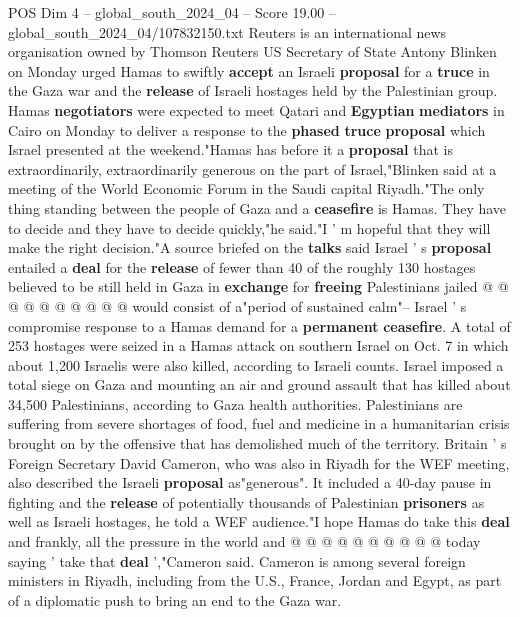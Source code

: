 \begin{textsample}{POS Dim 4 – global\_south\_2024\_04 – Score 19.00 – global\_south\_2024\_04/107832150.txt}  \label{ex:f4_pos_269}
Reuters is an international news organisation owned by Thomson Reuters US Secretary of State Antony Blinken on Monday urged Hamas to swiftly \textbf{accept} an Israeli \textbf{proposal} for a \textbf{truce} in the Gaza war and the \textbf{release} of Israeli hostages held by the Palestinian group.
Hamas \textbf{negotiators} were expected to meet Qatari and \textbf{Egyptian} \textbf{mediators} in Cairo on Monday to deliver a response to the \textbf{phased} \textbf{truce} \textbf{proposal} which Israel presented at the weekend."Hamas has before it a \textbf{proposal} that is extraordinarily, extraordinarily generous on the part of Israel,"Blinken said at a meeting of the World Economic Forum in the Saudi capital Riyadh."The only thing standing between the people of Gaza and a \textbf{ceasefire} is Hamas.
They have to decide and they have to decide quickly,"he said."I ' m hopeful that they will make the right decision."A source briefed on the \textbf{talks} said Israel ' s \textbf{proposal} entailed a \textbf{deal} for the \textbf{release} of fewer than 40 of the roughly 130 hostages believed to be still held in Gaza in \textbf{exchange} for \textbf{freeing} Palestinians jailed @ @ @ @ @ @ @ @ @ @ would consist of a"period of sustained calm"-- Israel ' s compromise response to a Hamas demand for a \textbf{permanent} \textbf{ceasefire}.
A total of 253 hostages were seized in a Hamas attack on southern Israel on Oct. 7 in which about 1,200 Israelis were also killed, according to Israeli counts.
Israel imposed a total siege on Gaza and mounting an air and ground assault that has killed about 34,500 Palestinians, according to Gaza health authorities.
Palestinians are suffering from severe shortages of food, fuel and medicine in a humanitarian crisis brought on by the offensive that has demolished much of the territory.
Britain ' s Foreign Secretary David Cameron, who was also in Riyadh for the WEF meeting, also described the Israeli \textbf{proposal} as"generous".
It included a 40-day pause in fighting and the \textbf{release} of potentially thousands of Palestinian \textbf{prisoners} as well as Israeli hostages, he told a WEF audience."I hope Hamas do take this \textbf{deal} and frankly, all the pressure in the world and @ @ @ @ @ @ @ @ @ @ today saying ' take that \textbf{deal} ',"Cameron said.
Cameron is among several foreign ministers in Riyadh, including from the U.S., France, Jordan and Egypt, as part of a diplomatic push to bring an end to the Gaza war.

\end{textsample}
